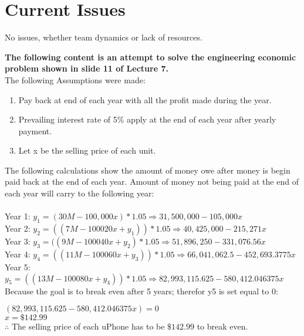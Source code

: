\documentclass[paper=usletter, fontsize=12pt]{article}
\begin{document}
    \section{Current Issues}
  No issues, whether team dynamics or lack of resources. 


   \newpage
   \textbf{The following content is an attempt to solve the engineering economic problem shown in slide 11 of Lecture 7.} \\
  
   The following Assumptions were made:  
   \begin{enumerate}
		\item Pay back at end of each year with all the profit made during the year.   
		\item Prevailing interest rate of 5\% apply at the end of each year after yearly payment.
		\item Let x be the selling price of each unit.
   \end{enumerate}
   
  The following calculations show the amount of money owe after money is begin paid back at the end of each year.  Amount of money not being paid at the end of each year will carry to the following year:\\ \\
   Year 1: $y_1=(30M - 100,000x) * 1.05 \Rightarrow 31,500,000 - 105,000x$ \\
   Year 2: $y_2 = ((7M - 100020x + y_1 ))*1.05 \Rightarrow 40,425,000 - 215,271x$\\
   Year 3: $y_3 = ((9M - 100040x + y_2)*1.05 \Rightarrow 51,896,250 - 331,076.56x$\\
   Year 4: $y_4 = ((11M - 100060x + y_3))*1.05 \Rightarrow 66,041,062.5 - 452,693.3775x$\\
   Year 5: $y_5 = ((13M - 100080x + y_4))*1.05 \Rightarrow 82,993,115.625 - 580,412.046375x$\\
   
   
   Because the goal is to break even after 5 years; therefor y5 is set equal to 0:
   
   $(82,993,115.625 - 580,412.046375x) = 0$\\
   $x = \$142.99$\\
   
   $\therefore$ The selling price of each uPhone has to be $\$142.99$ to break even.
   
\end{document}
